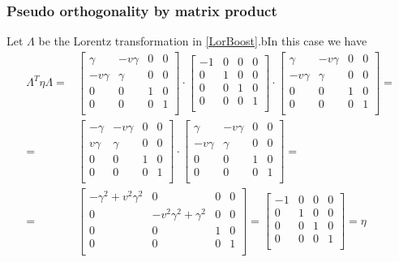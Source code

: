 \documentclass[main.tex]{subfiles}
\begin{document}
\subsubsection{Pseudo orthogonality by matrix product}

Let $\Lambda$ be the Lorentz transformation in \eqref{LorBoost}.bIn this case we have
\begin{align}
    \Lambda ^T\eta\Lambda=& \begin{bmatrix}
        \gamma & -v \gamma & 0 & 0\\
        -v \gamma & \gamma & 0 & 0\\
        0 & 0 & 1 & 0\\
        0 & 0 & 0 & 1\\
    \end{bmatrix}\cdot \begin{bmatrix}
        -1 & 0 & 0 & 0\\
        0 & 1 & 0 & 0\\
        0 & 0 & 1 & 0\\
        0 & 0 & 0 & 1\\
    \end{bmatrix}\cdot \begin{bmatrix}
        \gamma & -v \gamma & 0 & 0\\
        -v \gamma & \gamma & 0 & 0\\
        0 & 0 & 1 & 0\\
        0 & 0 & 0 & 1\\
    \end{bmatrix}=\nonumber\\
     =&\begin{bmatrix}
        -\gamma & -v \gamma & 0 & 0\\
        v \gamma & \gamma & 0 & 0\\
        0 & 0 & 1 & 0\\
        0 & 0 & 0 & 1\\
    \end{bmatrix}\cdot
    \begin{bmatrix}
        \gamma & -v \gamma & 0 & 0\\
        -v \gamma & \gamma & 0 & 0\\
        0 & 0 & 1 & 0\\
        0 & 0 & 0 & 1\\
    \end{bmatrix}=\nonumber\\
    =& \begin{bmatrix}
        -\gamma^2+v^2\gamma^2 & 0 & 0 & 0\\
        0 & -v^2\gamma^2+\gamma^2 & 0 & 0\\
        0 & 0 & 1 & 0\\
        0 & 0 & 0 & 1\\
    \end{bmatrix}=\begin{bmatrix}
        -1 & 0 & 0 & 0\\
        0 & 1 & 0 & 0\\
        0 & 0 & 1 & 0\\
        0 & 0 & 0 & 1\\
    \end{bmatrix}=\eta
\end{align}
\end{document}

